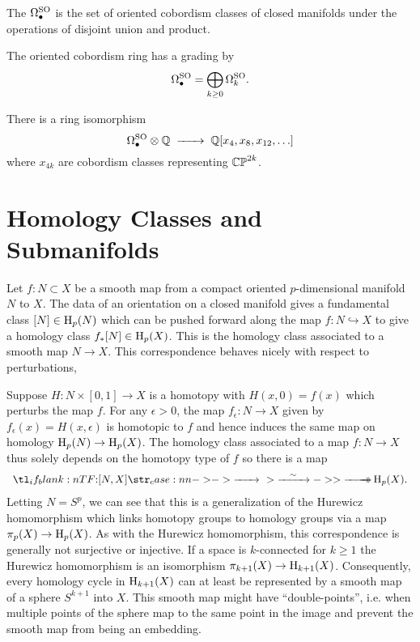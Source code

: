 \begin{definition}
	The  $\Omega^{\mathrm{SO}}_\bullet$ is the set of oriented cobordism classes of closed manifolds under the operations of disjoint union and product.
\end{definition}

The oriented cobordism ring has a grading by
\[
	\Omega_\bullet^{\mathrm{SO}} = \bigoplus_{k\geq 0} \Omega^{\mathrm{SO}}_k.
\]

\begin{theorem}\label{thm:oriented-cobordism-structure}
	There is a ring isomorphism
	\[
		\Omega_\bullet^\SO \otimes \Q \lkxto \Q[x_4, x_8, x_{12}, \ldots]
	\]
	where $x_{4k}$ are cobordism classes representing $\mathbb{CP}^{2k}$.
\end{theorem}

\pagebreak
\section{Homology Classes and Submanifolds}\label{sec:representing-homology-classes}

Let $f : N\subset X$ be a smooth map from a compact oriented $p$-dimensional manifold $N$ to $X$. The data of an orientation on a closed manifold gives a fundamental class $[N]\in \operatorname{H}_p(N)$ which can be pushed forward along the map $f : N \hookrightarrow X$ to give a homology class $f_* [N]\in \operatorname{H}_p(X)$. This is the homology class associated to a smooth map $N\to X$.
This correspondence behaves nicely with respect to perturbations, 

Suppose $H : N\times [0,1] \to X$ is a homotopy with $H(x,0)=f(x)$ which perturbs the map $f$. For any $\epsilon>0$, the map $f_\epsilon : N \to X$ given by $f_\epsilon(x)=H(x,\epsilon)$ is homotopic to $f$ and hence induces the same map on homology $\operatorname{H}_p(N)\to \operatorname{H}_p(X)$. The homology class associated to a map $f : N \to X$ thus solely depends on the homotopy type of $f$ so there is a map
\begin{equation}
	\lkxfunc{}{[N,X]}{\H_p(X).}
\end{equation}
Letting $N=S^p$, we can see that this is a generalization of the Hurewicz homomorphism which links homotopy groups to homology groups via a map $\pi_p(X) \to \operatorname{H}_p(X)$.
As with the Hurewicz homomorphism, this correspondence is generally not surjective or injective. If a space is $k$-connected for $k\geq 1$ the Hurewicz homomorphism is an isomorphism $\pi_{k+1}(X) \to \operatorname{H}_{k+1}(X)$. Consequently, every homology cycle in $\operatorname{H}_{k+1}(X)$ can at least be represented by a smooth map of a sphere $S^{k+1}$ into $X$. This smooth map might have ``double-points'', i.e. when multiple points of the sphere map to the same point in the image and prevent the smooth map from being an embedding.

